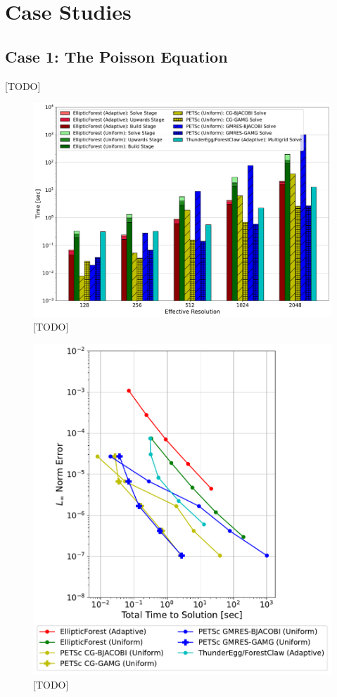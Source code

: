 \section{Case Studies}
\label{sec:case-studies}

\subsection{Case 1: The Poisson Equation}

[TODO]

\begin{figure}
    \centering
    \includegraphics[width=1.0\textwidth, clip=true, trim={60 20 100 60}]{figures/case01-stacked-bar-plot-comparisons-no-title.pdf}
    \caption{[TODO]}
    \label{fig:case01-stacked-bar-plot}
\end{figure}

\begin{figure}
    \centering
    \includegraphics[width=1.0\textwidth, clip=true, trim={40 20 80 50}]{figures/case01-work-precision-plots-no-title.pdf}
    \caption{[TODO]}
    \label{fig:case01-work-precision-plot}
\end{figure}